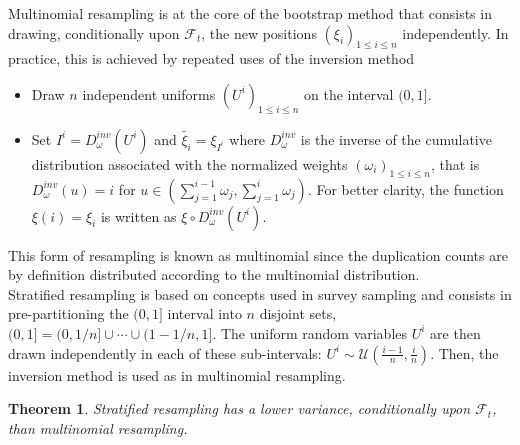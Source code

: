 \documentclass[11pt,a4,twosided,singlespacing,titlepagenumber=on]{scrreprt}
\numberwithin{equation}{chapter} %
\newtheorem{theorem}{Theorem}%
\theoremstyle{remark}
\begin{document}
Multinomial resampling is at the core of the bootstrap method that consists in drawing, conditionally upon $\mathcal{F}_t$, the new positions $\left( \xi_i \right)_{1 \leq i \leq n}$ independently. In practice, this is achieved by repeated uses of the inversion method
\begin{itemize}
\item Draw $n$ independent uniforms $(U^i)_{1 \leq i \leq n}$ on the interval $(0, 1]$.
\item Set $I^i = D_\omega^{inv}(U^i)$ and $\widetilde{\xi_i} = \xi_{I^i}$ where $D_\omega^{inv}$ is the inverse of the cumulative distribution associated with the normalized weights $\left( \omega_i \right)_{1 \leq i \leq n}$, that is $D_\omega^{inv}(u) = i$ for $u \in \left( \sum_{j=1}^{i-1} \omega_j, \sum_{j=1}^i \omega_j \right)$. For better clarity, the function $\xi(i) = \xi_i$ is written as $\xi \circ D_\omega^{inv}(U^i)$.
\end{itemize}
This form of resampling is known as multinomial since the duplication counts are by definition distributed according to the multinomial distribution. \\


Stratified resampling is based on concepts used in survey sampling and consists in pre-partitioning the $(0,1]$ interval into $n$ disjoint sets, $(0,1] = (0, 1/n] \cup \cdots \cup (1-1/n, 1]$. The uniform random variables $U^i$ are then drawn independently in each of these sub-intervals: $U^i \sim \mathcal{U}\left( \frac{i-1}{n}, \frac{i}{n} \right)$. Then, the inversion method is used as in multinomial resampling.

\begin{theorem}
\textit{
Stratified resampling has a lower variance, conditionally upon $\mathcal{F}_t$, than multinomial resampling.
}
\end{theorem}
\end{document}

